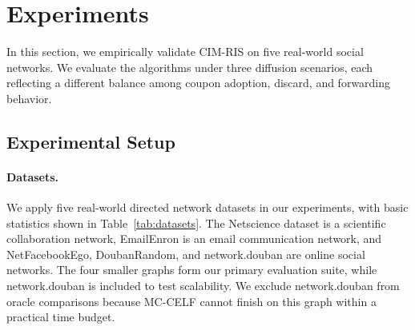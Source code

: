 \documentclass[sigconf]{acmart}
\newcommand{\CIMRIS}{\textsc{CIM-RIS}}
\begin{document}
\section{Experiments}
\label{sec:exp}

In this section, we empirically validate \CIMRIS{} on five real-world
social networks.
We evaluate the algorithms under three diffusion scenarios, each
reflecting a different balance among coupon adoption, discard, and
forwarding behavior.

\subsection{Experimental Setup}
\label{sec:exp-setup}

\paragraph{Datasets.}
We apply five real-world directed network datasets in our experiments,
with basic statistics shown in Table~\ref{tab:datasets}.
The Netscience dataset is a scientific collaboration network, EmailEnron
is an email communication network, and NetFacebookEgo, DoubanRandom, and
network.douban are online social networks.
The four smaller graphs form our primary evaluation suite, while
network.douban is included to test scalability.
We exclude network.douban from oracle comparisons because MC-CELF cannot
finish on this graph within a practical time budget.

\begin{table}[t]
  \caption{Datasets used in the experiments.}
  \label{tab:datasets}
  \centering
\end{table}
\end{document}
